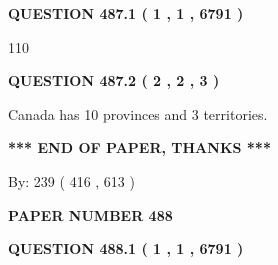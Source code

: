 \documentclass[12pt]{article}
\begin{document}
   
  
\vspace{0.2in}
  
{\textbf{\Large{QUESTION
487.1 
 ( 1 , 1 , 6791 )
}}}
  
  
 
 
\noindent{}

110
 
 
  
\vspace{0.2in}
  
{\textbf{\Large{QUESTION
487.2 
 ( 2 , 2 , 3 )
}}}
  
  
 
 
\noindent{}
 
 
Canada has 10  provinces and 3 territories.
 
 
 
 
   
   
 \vspace{0.2in}
 
   
   
   
   
\vspace{1.0in} 
{\textbf{\large{ *** END OF PAPER, THANKS *** }}} 
   
   
\hspace{1.0in} By: 
 239 ( 416 ,  613 )
   
   
   
   
\newpage 
\setcounter{page}{ 
   488001 } 
   
   
   
   
 {\textbf{ \Large{ PAPER NUMBER  488  }}}
   
   
\vspace{0.2in}
   
   
   
   
   
   
 \vspace{0.2in}
 
 
 
 
   
   
  
\vspace{0.2in}
  
{\textbf{\Large{QUESTION
488.1 
 ( 1 , 1 , 6791 )
}}}
  
\end{document}
